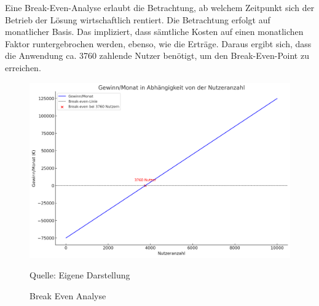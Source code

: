 Eine Break-Even-Analyse erlaubt die Betrachtung, ab welchem Zeitpunkt sich der Betrieb der Lösung wirtschaftlich rentiert.
Die Betrachtung erfolgt auf monatlicher Basis.
Das impliziert, dass sämtliche Kosten auf einen monatlichen Faktor runtergebrochen werden, ebenso, wie die Erträge.
Daraus ergibt sich, dass die Anwendung ca. 3760 zahlende Nutzer benötigt, um den Break-Even-Point zu erreichen.

\begin{figure}[htbp]
    \includegraphics[width=\textwidth, height=\textheight, keepaspectratio]{abbildungen/Break_Even}
    \caption{Break Even Analyse}
    \label{fig:BreakEven}
    \vspace{0.5cm}
    \raggedright Quelle: Eigene Darstellung
\end{figure}